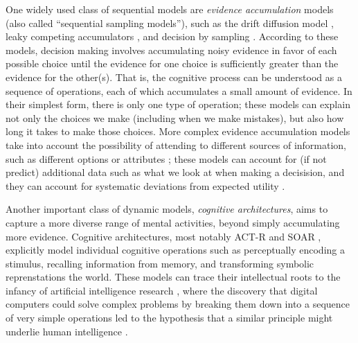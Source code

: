 One widely used class of sequential models are \emph{evidence accumulation} models (also called ``sequential sampling models''), such as the drift diffusion model \citep{ratcliff1978theory}, leaky competing accumulators \citep{usher2001time}, and decision by sampling \citep{stewart2006decision}. According to these models, decision making involves accumulating noisy evidence in favor of each possible choice until the evidence for one choice is sufficiently greater than the evidence for the other(s). That is, the cognitive process can be understood as a sequence of operations, each of which accumulates a small amount of evidence. In their simplest form, there is only one type of operation; these models can explain not only the choices we make (including when we make mistakes), but also how long it takes to make those choices. More complex evidence accumulation models take into account the possibility of attending to different sources of information, such as different options \citep{krajbich2010visual} or attributes \citep{russo1983strategies}; these models can account for (if not predict) additional data such as what we look at when making a decisision, and they can account for systematic deviations from expected utility \citep{busemeyer2019cognitive}.

Another important class of dynamic models, \emph{cognitive architectures}, aims to capture a more diverse range of mental activities, beyond simply accumulating more evidence. Cognitive architectures, most notably ACT-R \citep{anderson1996act} and SOAR \citep{laird1987soar}, explicitly model individual cognitive operations such as perceptually encoding a stimulus, recalling information from memory, and transforming symbolic reprenstations the world. These models can trace their intellectual roots to the infancy of artificial intelligence research \citep{newell1956logic}, where the discovery that digital computers could solve complex problems by breaking them down into a sequence of very simple operations led to the hypothesis that a similar principle might underlie human intelligence \citep{newell1958elements,newell1972human}. 

